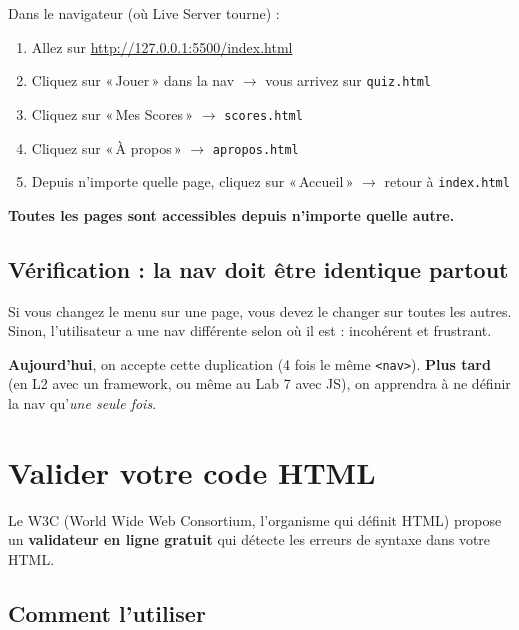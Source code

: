 \documentclass[11pt,a4paper]{article}
\newcommand{\cmark}{\ding{51}}
\begin{document}
Dans le navigateur (où Live Server tourne) :
\begin{enumerate}[nosep]
    \item Allez sur \url{http://127.0.0.1:5500/index.html}
    \item Cliquez sur «\,Jouer\,» dans la nav $\to$ vous arrivez sur \texttt{quiz.html}
    \item Cliquez sur «\,Mes Scores\,» $\to$ \texttt{scores.html}
    \item Cliquez sur «\,À propos\,» $\to$ \texttt{apropos.html}
    \item Depuis n'importe quelle page, cliquez sur «\,Accueil\,» $\to$ retour à \texttt{index.html}
\end{enumerate}

\textbf{Toutes les pages sont accessibles depuis n'importe quelle autre.} \cmark

\subsection{Vérification : la nav doit être identique partout}

\begin{attentionbox}
Si vous changez le menu sur une page, vous devez le changer sur toutes
les autres. Sinon, l'utilisateur a une nav différente selon où il est :
incohérent et frustrant.

\medskip

\textbf{Aujourd'hui}, on accepte cette duplication (4 fois le même
\texttt{<nav>}). \textbf{Plus tard} (en L2 avec un framework, ou même au
Lab 7 avec JS), on apprendra à ne définir la nav qu'\emph{une seule fois}.
\end{attentionbox}

\newpage

\section{Valider votre code HTML}

Le W3C (World Wide Web Consortium, l'organisme qui définit HTML) propose
un \textbf{validateur en ligne gratuit} qui détecte les erreurs de syntaxe
dans votre HTML.

\subsection{Comment l'utiliser}
\end{document}
